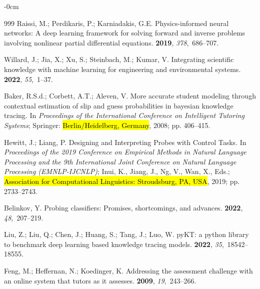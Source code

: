 \documentclass[applsci,article,accept,moreauthors,pdftex]{Definitions/mdpi}
\begin{document}
\begin{adjustwidth}{-\extralength}{0cm}
\begin{thebibliography}{999}
Raissi, M.; Perdikaris, P.; Karniadakis, G.E.
\newblock Physics-informed neural networks: A deep learning framework for
  solving forward and inverse problems involving nonlinear partial differential
  equations.
 {\bf 2019}, {\em
  378},~686--707.

Willard, J.; Jia, X.; Xu, S.; Steinbach, M.; Kumar, V.
\newblock Integrating scientific knowledge with machine learning for
  engineering and environmental systems.
 {\bf 2022}, {\em 55},~1--37.

Baker, R.S.d.; Corbett, A.T.; Aleven, V.
\newblock More accurate student modeling through contextual estimation of slip
  and guess probabilities in bayesian knowledge tracing.
\newblock In \textit{Proceedings of the International Conference on Intelligent
  Tutoring Systems}; Springer: \hl{Berlin/Heidelberg, Germany},  2008; pp. 406--415.

Hewitt, J.; Liang, P.
\newblock Designing and Interpreting Probes with Control Tasks.
\newblock In \textit{Proceedings of the 2019 Conference on Empirical
  Methods in Natural Language Processing and the 9th International Joint
  Conference on Natural Language Processing (EMNLP-IJCNLP)}; Inui, K., Jiang,
  J., Ng, V., Wan, X., Eds.; \hl{Association for Computational Linguistics: Stroudsburg, PA, USA},  2019; pp. 2733--2743.

Belinkov, Y.
\newblock Probing classifiers: Promises, shortcomings, and advances.
 {\bf 2022}, {\em 48},~207--219.

Liu, Z.; Liu, Q.; Chen, J.; Huang, S.; Tang, J.; Luo, W.
\newblock pyKT: a python library to benchmark deep learning based knowledge
  tracing models.
 {\bf 2022},
  {\em 35},~18542--18555.

Feng, M.; Heffernan, N.; Koedinger, K.
\newblock Addressing the assessment challenge with an online system that tutors
  as it assesses.
 {\bf 2009}, {\em
  19},~243--266.


\end{thebibliography}
\end{adjustwidth}
\end{document}
